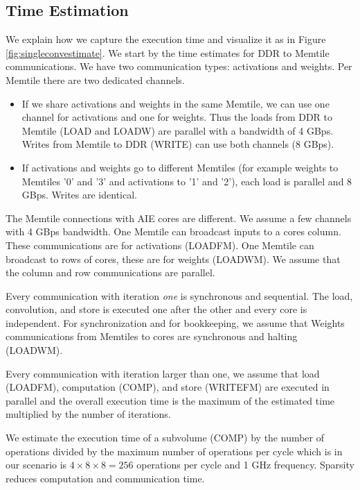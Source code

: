 \documentclass[conference]{IEEEtran}
\begin{document}
\subsection{Time Estimation}
\label{sec:timeestimate}
We explain how we capture the execution time and visualize it as in
Figure \ref{fig:singleconvestimate}. We start by the time estimates
for DDR to Memtile communications. We have two communication types:
activations and weights. Per Memtile there are two dedicated channels.
\begin{itemize}
 \item If we share activations and weights in the same Memtile, we can
   use one channel for activations and one for weights. Thus the loads
   from DDR to Memtile (LOAD and LOADW) are parallel with a bandwidth
   of 4 GBps. Writes from Memtile to DDR (WRITE) can use both channels
   (8 GBps).

 \item If activations and weights go to different Memtiles (for
   example weights to Memtiles '0' and '3' and activations to '1' and
   '2'), each load is parallel and 8 GBps. Writes are identical.
\end{itemize}
   
The Memtile connections with AIE cores are different. We assume a few
channels with 4 GBps bandwidth. One Memtile can broadcast inputs to a
cores column. These communications are for activations (LOADFM). One
Memtile can broadcast to rows of cores, these are for weights
(LOADWM). We assume that the column and row communications are
parallel.

Every communication with iteration {\em one} is synchronous and
sequential.  The load, convolution, and store is executed one after
the other and every core is independent.  For synchronization and for
bookkeeping, we assume that Weights communications from Memtiles to
cores are synchronous and halting (LOADWM).

Every communication with iteration larger than one, we assume that
load (LOADFM), computation (COMP), and store (WRITEFM) are executed in
parallel and the overall execution time is the maximum of the
estimated time multiplied by the number of iterations.

We estimate the execution time of a subvolume (COMP) by the number of
operations divided by the maximum number of operations per cycle which
is in our scenario is $4\times 8 \times 8 = 256 $ operations per cycle
and 1 GHz frequency. Sparsity reduces computation and communication
time.
\end{document}
